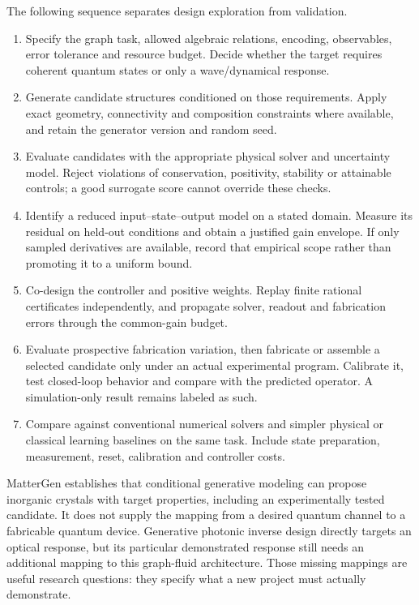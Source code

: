 The following sequence separates design exploration from validation.
\begin{enumerate}
\item Specify the graph task, allowed algebraic relations, encoding,
observables, error tolerance and resource budget. Decide whether the
target requires coherent quantum states or only a wave/dynamical response.
\item Generate candidate structures conditioned on those requirements.
Apply exact geometry, connectivity and composition constraints where
available, and retain the generator version and random seed.
\item Evaluate candidates with the appropriate physical solver and
uncertainty model. Reject violations of conservation, positivity,
stability or attainable controls; a good surrogate score cannot override
these checks.
\item Identify a reduced input--state--output model on a stated domain.
Measure its residual on held-out conditions and obtain a justified gain
envelope. If only sampled derivatives are available, record that empirical
scope rather than promoting it to a uniform bound.
\item Co-design the controller and positive weights. Replay finite
rational certificates independently, and propagate solver, readout and
fabrication errors through the common-gain budget.
\item Evaluate prospective fabrication variation, then fabricate or
assemble a selected candidate only under an actual experimental program.
Calibrate it, test closed-loop behavior and compare with the predicted
operator. A simulation-only result remains labeled as such.
\item Compare against conventional numerical solvers and simpler
physical or classical learning baselines on the same task. Include
state preparation, measurement, reset, calibration and controller costs.
\end{enumerate}

MatterGen establishes that conditional generative modeling can propose
inorganic crystals with target properties, including an experimentally
tested candidate. It does not supply the mapping from a desired quantum
channel to a fabricable quantum device.\cite{qtsZeni2025}
Generative photonic inverse design directly targets an optical response,
but its particular demonstrated response still needs an additional mapping
to this graph-fluid architecture.\cite{qtsJiangFan2019}
Those missing mappings are useful research questions: they specify what a
new project must actually demonstrate.

